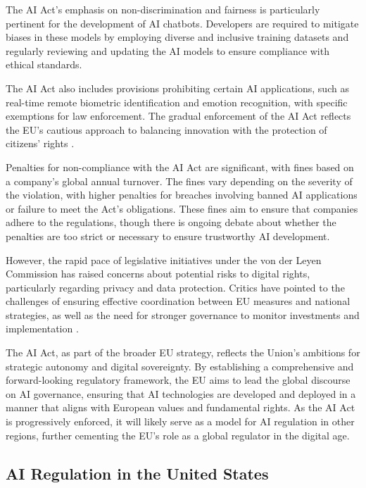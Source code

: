 The AI Act's emphasis on non-discrimination and fairness is particularly pertinent for the development of AI chatbots. Developers are required to mitigate biases in these models by employing diverse and inclusive training datasets and regularly reviewing and updating the AI models to ensure compliance with ethical standards.

The AI Act also includes provisions prohibiting certain AI applications, such as real-time remote biometric identification and emotion recognition, with specific exemptions for law enforcement. The gradual enforcement of the AI Act reflects the EU's cautious approach to balancing innovation with the protection of citizens' rights \cite{atlantic_council_eu_ai_rules_2023}.

Penalties for non-compliance with the AI Act are significant, with fines based on a company’s global annual turnover. The fines vary depending on the severity of the violation, with higher penalties for breaches involving banned AI applications or failure to meet the Act’s obligations. These fines aim to ensure that companies adhere to the regulations, though there is ongoing debate about whether the penalties are too strict or necessary to ensure trustworthy AI development.

However, the rapid pace of legislative initiatives under the von der Leyen Commission has raised concerns about potential risks to digital rights, particularly regarding privacy and data protection. Critics have pointed to the challenges of ensuring effective coordination between EU measures and national strategies, as well as the need for stronger governance to monitor investments and implementation \cite{wikipedia_ai_regulation}.

The AI Act, as part of the broader EU strategy, reflects the Union's ambitions for strategic autonomy and digital sovereignty. By establishing a comprehensive and forward-looking regulatory framework, the EU aims to lead the global discourse on AI governance, ensuring that AI technologies are developed and deployed in a manner that aligns with European values and fundamental rights. As the AI Act is progressively enforced, it will likely serve as a model for AI regulation in other regions, further cementing the EU's role as a global regulator in the digital age.

\subsection{AI Regulation in the United States }

